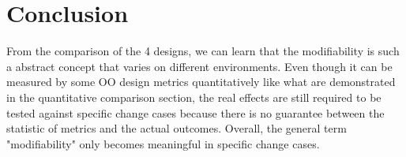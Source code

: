 \documentclass[conference]{IEEEtran}
\begin{document}
	
	
	
	
	
	
	
	\section{Conclusion}
	From the comparison of the 4 designs, we can learn that the modifiability is such a abstract concept that varies on different environments. Even though it can be measured by some \gls{OO} design metrics quantitatively like what are demonstrated in the quantitative comparison section, the real effects are still required to be tested against specific change cases because there is no guarantee between the statistic of metrics and the actual outcomes. Overall, the general term "modifiability" only becomes meaningful in specific change cases. 
	
\end{document}
